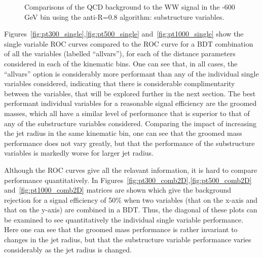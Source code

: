 \begin{figure}
\begin{center}
\caption{Comparisons of the QCD background to the WW signal in the -600 GeV bin using the anti-\kT R=0.8 algorithm:
  substructure variables.}
\label{fig:pt500_subst_AKt_R08}
\end{center}
\end{figure}


Figures~\ref{fig:pt300_single},\ref{fig:pt500_single}
and~\ref{fig:pt1000_single} show the single variable ROC curves
compared to the ROC curve for a BDT combination of all the variables
(labelled ``allvars''),
for each of the \antikt distance parameters considered in each of the
kinematic bins. One can see that, in all cases, the ``allvars'' option
is considerably more performant than any of the individual single variables
considered, indicating that there is considerable complimentarity
between the variables, that will be explored further in the next
section. The best performant individual variables for a reasonable signal
efficiency are the groomed masses, which all have a similar
level of performance that is superior to that of any of the
substructure variables considered. Comparing the impact of increasing the jet
radius in the same kinematic bin, one can see that the groomed mass
performance does not vary greatly, but that the performance of the
substructure variables is markedly worse for larger jet radius.

Although the ROC curves give all the relavant information, it is hard
to compare performance quantitatively. In
Figures~\ref{fig:pt300_comb2D},\ref{fig:pt500_comb2D}
and~\ref{fig:pt1000_comb2D} matrices are shown which give the
background rejection for a signal efficiency of 50\% when two
variables (that on the x-axis and that on the y-axis) are combined in
a BDT. Thus, the diagonal of these plots can be examined to see
quantitatively the individual single variable performance. Here one
can see that the groomed mass performance is rather invariant to
changes in the jet radius, but that the substructure variable
performance varies considerably as the jet radius is changed. 



